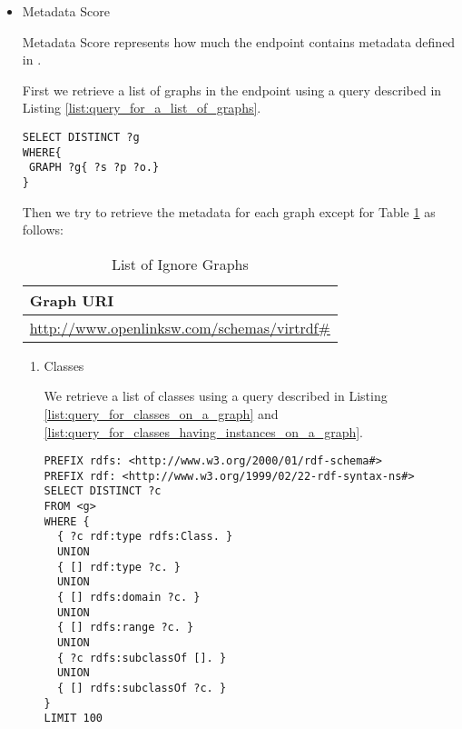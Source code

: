 \documentclass[11pt,a4paper]{article}
\begin{document}
\begin{itemize}
  \item Metadata Score

  Metadata Score represents how much the endpoint contains metadata defined in \cite{SparqleBuilderMetadata}.

  First we retrieve a list of graphs in the endpoint using a query described in Listing \ref{list:query_for_a_list_of_graphs}.

  \begin{lstlisting}[basicstyle=\ttfamily\footnotesize,breaklines=true,frame=single,caption=Obtain graph URIs on a SPARQL endpoint,label=list:query_for_a_list_of_graphs]
SELECT DISTINCT ?g
WHERE{
 GRAPH ?g{ ?s ?p ?o.}
}
  \end{lstlisting}

  Then we try to retrieve the metadata for each graph except for Table \ref{table:ignore_graphs} as follows:

  \begin{table}[htbp]
    \center
    \begin{tabular}{|l|}
      \hline
      Graph URI \\
      \hline
      \url{http://www.openlinksw.com/schemas/virtrdf#} \\
      \hline
    \end{tabular}
    \caption{List of Ignore Graphs}
    \label{table:ignore_graphs}
  \end{table}

  \begin{enumerate}

    \item Classes

    We retrieve a list of classes using a query described in Listing \ref{list:query_for_classes_on_a_graph} and \ref{list:query_for_classes_having_instances_on_a_graph}.

    \begin{lstlisting}[basicstyle=\ttfamily\footnotesize,breaklines=true,frame=single,caption=Obtain the classes on a graph g,label=list:query_for_classes_on_a_graph]
PREFIX rdfs: <http://www.w3.org/2000/01/rdf-schema#>
PREFIX rdf: <http://www.w3.org/1999/02/22-rdf-syntax-ns#>
SELECT DISTINCT ?c
FROM <g>
WHERE {
  { ?c rdf:type rdfs:Class. }
  UNION
  { [] rdf:type ?c. }
  UNION
  { [] rdfs:domain ?c. }
  UNION
  { [] rdfs:range ?c. }
  UNION
  { ?c rdfs:subclassOf []. }
  UNION
  { [] rdfs:subclassOf ?c. }
}
LIMIT 100
    \end{lstlisting}


\end{enumerate}
\end{itemize}
\end{document}
